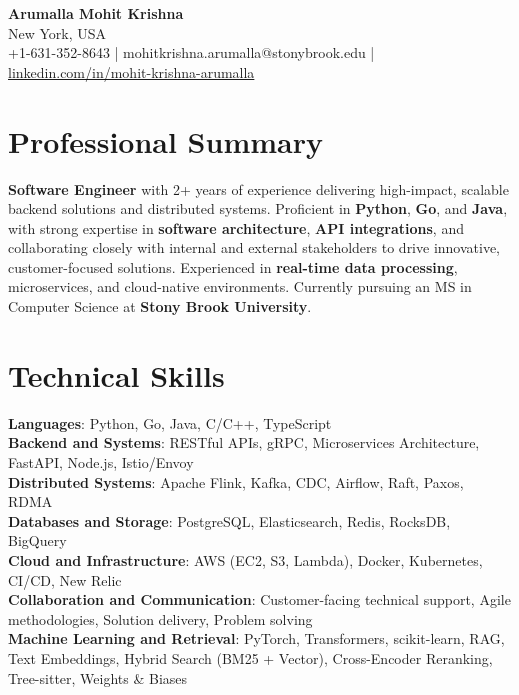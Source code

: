 \documentclass[letterpaper,11pt]{article}
\begin{document}
\begin{center}
  {\Large \textbf{Arumalla Mohit Krishna}} \\
  New York, USA \\
  +1-631-352-8643 \enspace | \enspace mohitkrishna.arumalla@stonybrook.edu \enspace | \enspace \href{https://www.linkedin.com/in/mohit-krishna-arumalla}{linkedin.com/in/mohit-krishna-arumalla}
\end{center}

\section{Professional Summary}
  \begin{itemize}[leftmargin=0.15in, label={}]
    \small{\item{
     \textbf{Software Engineer} with 2+ years of experience delivering high-impact, scalable backend solutions and distributed systems. Proficient in \textbf{Python}, \textbf{Go}, and \textbf{Java}, with strong expertise in \textbf{software architecture}, \textbf{API integrations}, and collaborating closely with internal and external stakeholders to drive innovative, customer-focused solutions. Experienced in \textbf{real-time data processing}, microservices, and cloud-native environments. Currently pursuing an MS in Computer Science at \textbf{Stony Brook University}.
    }}
  \end{itemize}
\vspace{-16pt}

\section{Technical Skills}
 \begin{itemize}[leftmargin=0.15in, label={}]
    \small{\item{
     \textbf{Languages}: Python, Go, Java, C/C++, TypeScript \\
     \textbf{Backend and Systems}: RESTful APIs, gRPC, Microservices Architecture, FastAPI, Node.js, Istio/Envoy \\
     \textbf{Distributed Systems}: Apache Flink, Kafka, CDC, Airflow, Raft, Paxos, RDMA \\
     \textbf{Databases and Storage}: PostgreSQL, Elasticsearch, Redis, RocksDB, BigQuery \\
     \textbf{Cloud and Infrastructure}: AWS (EC2, S3, Lambda), Docker, Kubernetes, CI/CD, New Relic \\
     \textbf{Collaboration and Communication}: Customer-facing technical support, Agile methodologies, Solution delivery, Problem solving \\
     \textbf{Machine Learning and Retrieval}: PyTorch, Transformers, scikit-learn, RAG, Text Embeddings, Hybrid Search (BM25 + Vector), Cross-Encoder Reranking, Tree-sitter, Weights \& Biases
    }}
 \end{itemize}
\vspace{-16pt}
\end{document}
